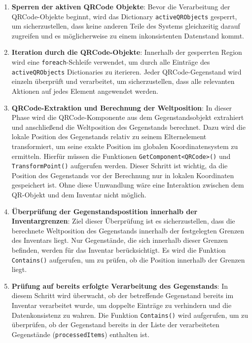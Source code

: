 \begin{enumerate}
    \item \textbf{Sperren der aktiven QRCode Objekte}:
    Bevor die Verarbeitung der QRCode-Objekte beginnt, wird das Dictionary \texttt{activeQRObjects} gesperrt, um
    sicherzustellen, dass keine anderen Teile des Systems gleichzeitig darauf zugreifen und es möglicherweise zu einem
    inkonsistenten Datenstand kommt.

    \item \textbf{Iteration durch die QRCode-Objekte}:
    Innerhalb der gesperrten Region wird eine \texttt{foreach}-Schleife verwendet, um durch alle Einträge des
    \texttt{activeQRObjects} Dictionaries zu iterieren. Jeder QRCode-Gegenstand wird einzeln überprüft und verarbeitet,
    um sicherzustellen, dass alle relevanten Aktionen auf jedes Element angewendet werden.

    \item \textbf{QRCode-Extraktion und Berechnung der Weltposition}:
    In dieser Phase wird die QRCode-Komponente aus dem Gegenstandsobjekt extrahiert und anschließend die Weltposition des
    Gegenstands berechnet. Dazu wird die lokale Position des Gegenstands relativ zu seinem Elternelement transformiert, um
    seine exakte Position im globalen Koordinatensystem zu ermitteln. Hierfür müssen die Funktionen \texttt{GetComponent<QRCode>()}
    und \texttt{TransformPoint()} aufgerufen werden. Dieser Schritt ist wichtig, da die Position des Gegenstands vor der
    Berechnung nur in lokalen Koordinaten gespeichert ist. Ohne diese Umwandlung wäre eine Interaktion zwischen dem QR-Objekt
    und dem Inventar nicht möglich.

    \item \textbf{Überprüfung der Gegenstandspostition innerhalb der Inventargrenzen}:
    Ziel dieser Überprüfung ist es sicherzustellen, dass die berechnete Weltposition des Gegenstands innerhalb der
    festgelegten Grenzen des Inventars liegt. Nur Gegenstände, die sich innerhalb dieser Grenzen befinden, werden für das
    Inventar berücksichtigt. Es wird die Funktion \texttt{Contains()} aufgerufen, um zu prüfen, ob die Position innerhalb
    der Grenzen liegt.

    \item \textbf{Prüfung auf bereits erfolgte Verarbeitung des Gegenstands}:
    In diesem Schritt wird überwacht, ob der betreffende Gegenstand bereits im Inventar verarbeitet wurde, um doppelte
    Einträge zu verhindern und die Datenkonsistenz zu wahren. Die Funktion \texttt{Contains()} wird aufgerufen, um zu
    überprüfen, ob der Gegenstand bereits in der Liste der verarbeiteten Gegenstände (\texttt{processedItems}) enthalten
    ist.


\end{enumerate}

